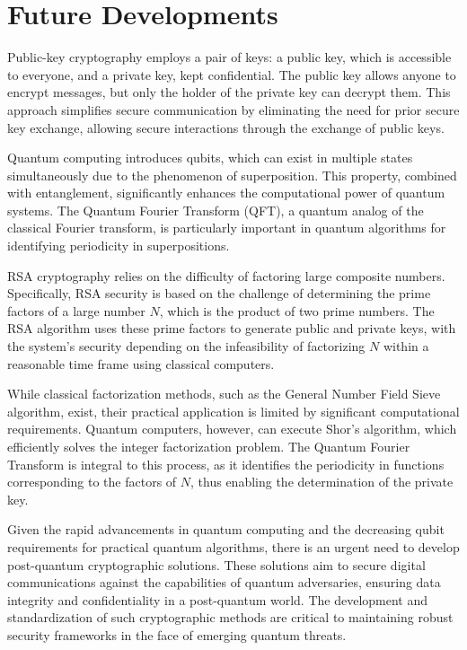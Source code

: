 \chapter{Future Developments}

Public-key cryptography employs a pair of keys: a public key, which is accessible to everyone, and a private key, kept confidential. The public key allows anyone to encrypt messages, but only the holder of the private key can decrypt them. This approach simplifies secure communication by eliminating the need for prior secure key exchange, allowing secure interactions through the exchange of public keys.

Quantum computing introduces qubits, which can exist in multiple states simultaneously due to the phenomenon of superposition. This property, combined with entanglement, significantly enhances the computational power of quantum systems. The Quantum Fourier Transform (QFT), a quantum analog of the classical Fourier transform, is particularly important in quantum algorithms for identifying periodicity in superpositions.

RSA cryptography relies on the difficulty of factoring large composite numbers. Specifically, RSA security is based on the challenge of determining the prime factors of a large number \( N \), which is the product of two prime numbers. The RSA algorithm uses these prime factors to generate public and private keys, with the system's security depending on the infeasibility of factorizing \( N \) within a reasonable time frame using classical computers.

While classical factorization methods, such as the General Number Field Sieve algorithm, exist, their practical application is limited by significant computational requirements. Quantum computers, however, can execute Shor's algorithm, which efficiently solves the integer factorization problem. The Quantum Fourier Transform is integral to this process, as it identifies the periodicity in functions corresponding to the factors of \( N \), thus enabling the determination of the private key.

Given the rapid advancements in quantum computing and the decreasing qubit requirements for practical quantum algorithms, there is an urgent need to develop post-quantum cryptographic solutions. These solutions aim to secure digital communications against the capabilities of quantum adversaries, ensuring data integrity and confidentiality in a post-quantum world. The development and standardization of such cryptographic methods are critical to maintaining robust security frameworks in the face of emerging quantum threats.

